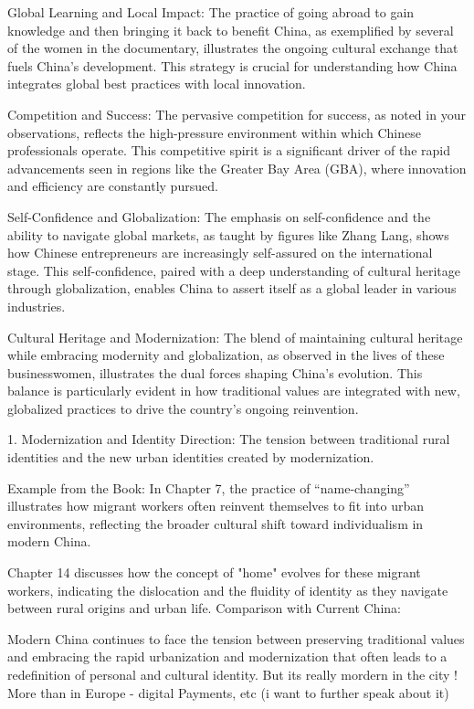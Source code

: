 Global Learning and Local Impact: The practice of going abroad to gain knowledge and then bringing it back to benefit China, as exemplified by several of the women in the documentary, illustrates the ongoing cultural exchange that fuels China's development. This strategy is crucial for understanding how China integrates global best practices with local innovation.


Competition and Success: The pervasive competition for success, as noted in your observations, reflects the high-pressure environment within which Chinese professionals operate. This competitive spirit is a significant driver of the rapid advancements seen in regions like the Greater Bay Area (GBA), where innovation and efficiency are constantly pursued.


Self-Confidence and Globalization: The emphasis on self-confidence and the ability to navigate global markets, as taught by figures like Zhang Lang, shows how Chinese entrepreneurs are increasingly self-assured on the international stage. This self-confidence, paired with a deep understanding of cultural heritage through globalization, enables China to assert itself as a global leader in various industries.


Cultural Heritage and Modernization: The blend of maintaining cultural heritage while embracing modernity and globalization, as observed in the lives of these businesswomen, illustrates the dual forces shaping China's evolution. This balance is particularly evident in how traditional values are integrated with new, globalized practices to drive the country's ongoing reinvention.

1. Modernization and Identity
Direction: The tension between traditional rural identities and the new urban identities created by modernization.

Example from the Book:
In Chapter 7, the practice of “name-changing” illustrates how migrant workers often reinvent themselves to fit into urban environments, reflecting the broader cultural shift toward individualism in modern China.

Chapter 14 discusses how the concept of "home" evolves for these migrant workers, indicating the dislocation and the fluidity of identity as they navigate between rural origins and urban life.
Comparison with Current China:

Modern China continues to face the tension between preserving traditional values and embracing the rapid urbanization and modernization that often leads to a redefinition of personal and cultural identity. But its really mordern in the city ! More than in Europe - digital Payments, etc (i want to further speak about it)


